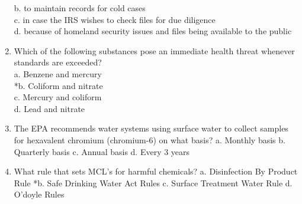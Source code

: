 \begin{enumerate}
b. to maintain records for cold cases\\
c. in case the IRS wishes to check files for due diligence\\
d. because of homeland security issues and files being available to the public\\
\item Which of the following substances pose an immediate health threat whenever standards are exceeded?\\
a.  Benzene and mercury\\
*b. Coliform and nitrate\\
c.  Mercury and coliform\\
d.  Lead and nitrate\\
\item The EPA recommends water systems using surface water to collect samples for hexavalent chromium (chromium-6) on what basis?
a. Monthly basis
b. Quarterly basis
c. Annual basis
d. Every 3 years

\item What rule that sets MCL's for harmful chemicals?
a. Disinfection By Product Rule
*b. Safe Drinking Water Act Rules
c. Surface Treatment Water Rule
d. O'doyle Rules
\end{enumerate}


